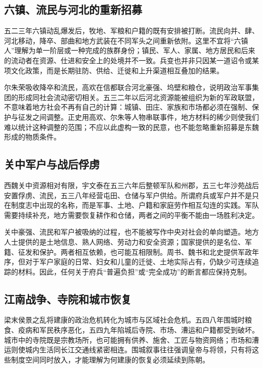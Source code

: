 \subsection{六镇、流民与河北的重新招募}

五二三年六镇动乱爆发后，牧地、军粮和户籍的既有安排被打断。流民向并、肆、河北移动，降卒、部曲和地方武装在不同军头之间重新依附。这里不宜将“六镇人”理解为单一阶层或一种完成的族群身份；镇民、军人、家属、地方居民和后来的流动者在资源、仕进和安全上的处境并不一致。兵变也并非只因某一道诏令或某项文化政策，而是长期驻防、供给、迁徙和上升渠道相互叠加的结果。

尔朱荣吸收降卒和流民，高欢在信都联合河北豪强、坞壁和粮仓，说明政治军事集团的形成同社会流动密切相关。五三二年以后河北资源能被组织为新的军政联盟，不意味着地方社会不再有自己的计算：城镇、田庄、家族和市场都必须在强制、保护与征发之间调整。正史用高欢、尔朱等人物串联事件，地方材料的稀少则使我们难以统计这种调整的范围；不应以此虚构一致的民意，也不能忽略重新招募是东魏形成的物质条件。

\subsection{关中军户与战后俘虏}

西魏关中资源相对有限，宇文泰在五三六年后整顿军队和州郡，五三七年沙苑战后安置俘虏、流民，五三八年经营屯田、仓储与军户供给。所谓府兵或军户并不是只在制度志中出现的名称，而是军事、土地、户籍和家庭劳作相互勾连的实践。军队需要持续补充，地方需要恢复耕作和仓储，两者之间的平衡不能由一场胜利决定。

关中豪强、流民和军户被吸纳的过程，也不能被写作中央对社会的单向塑造。地方人士提供的是土地信息、熟人网络、劳动力和安全资源；国家提供的是名位、军籍、征发和保护。两者相互依赖，也可能互相限制。周书、魏书和北史提供军政年序，但对于军户家庭的日常、妇女和儿童的迁徙、土地实际占有，仍缺少可连续追踪的材料。因此，任何关于府兵“普遍负担”或“完全成功”的断言都应保持克制。

\subsection{江南战争、寺院和城市恢复}

梁末侯景之乱将建康的政治危机转化为城市与区域社会危机。五四八年围城时粮食、疫病和军民秩序恶化，五四九年陷城后寺院、市场、漕运和户籍都受到破坏。城市中的寺院既是宗教场所，也可能拥有供养、施舍、工匠与物资网络；市场和漕运则使城内生活同长江交通线紧密相连。围城叙事往往强调皇帝与将领，只有将这些制度空间同时放入，才能理解为何建康的恢复必须延续到陈朝。

